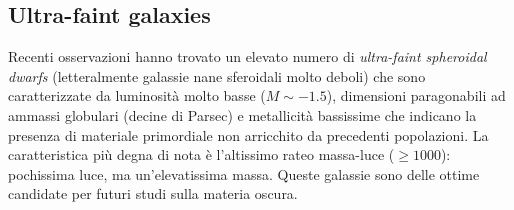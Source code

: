 \subsection{Ultra-faint galaxies}
Recenti osservazioni hanno trovato un elevato numero di \emph{ultra-faint spheroidal dwarfs} (letteralmente galassie nane sferoidali molto deboli) che sono caratterizzate da luminosità molto basse ($M \sim {-1.5}$), dimensioni paragonabili ad ammassi globulari (decine di Parsec) e metallicità bassissime che indicano la presenza di materiale primordiale non arricchito da precedenti popolazioni. La caratteristica più degna di nota è l’altissimo rateo massa-luce ($\geq 1000$): pochissima luce, ma un’elevatissima massa.
Queste galassie sono delle ottime candidate per futuri studi sulla materia oscura.
